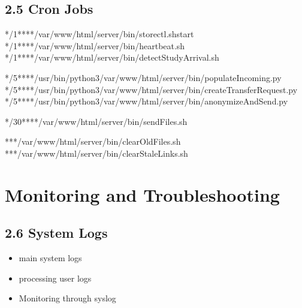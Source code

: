 \documentclass[letterpaper,10pt,english]{sphinxmanual}
\begin{document}
\subsection{2.5 Cron Jobs}
\label{\detokenize{Temp/admin-options:cron-jobs}}
\begin{sphinxVerbatim}[commandchars=\\\{\}]
*/1****/var/www/html/server/bin/storectl.shstart
*/1****/var/www/html/server/bin/heartbeat.sh
*/1****/var/www/html/server/bin/detectStudyArrival.sh

*/5****/usr/bin/python3/var/www/html/server/bin/populateIncoming.py
*/5****/usr/bin/python3/var/www/html/server/bin/createTransferRequest.py
*/5****/usr/bin/python3/var/www/html/server/bin/anonymizeAndSend.py

*/30****/var/www/html/server/bin/sendFiles.sh

***/var/www/html/server/bin/clearOldFiles.sh
***/var/www/html/server/bin/clearStaleLinks.sh
\end{sphinxVerbatim}


\section{Monitoring and Troubleshooting}
\label{\detokenize{Temp/admin-options:monitoring-and-troubleshooting}}

\subsection{2.6 System Logs}
\label{\detokenize{Temp/admin-options:system-logs}}\begin{itemize}
\item {} 
\sphinxAtStartPar
{} \sphinxhyphen{} main system logs

\item {} 
\sphinxAtStartPar
{} \sphinxhyphen{} processing user logs

\item {} 
\sphinxAtStartPar
Monitoring through syslog

\end{itemize}
\end{document}
